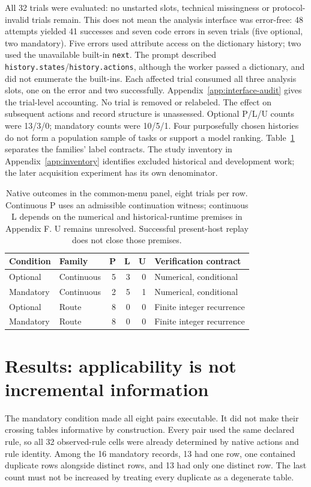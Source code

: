 All 32 trials were evaluated: no unstarted slots, technical missingness or
protocol-invalid trials remain. This does not mean the analysis interface was
error-free: 48 attempts yielded 41 successes and seven code errors in seven
trials (five optional, two mandatory). Five errors used attribute access on
the dictionary history; two used the unavailable built-in \texttt{next}.
The prompt described \texttt{history.states}/\texttt{history.actions}, although
the worker passed a dictionary, and did not enumerate the built-ins.
Each affected trial consumed all three analysis slots, one on the error and
two successfully. Appendix~\ref{app:interface-audit} gives the trial-level
accounting. No trial is removed or relabeled. The effect on subsequent
actions and record structure is unassessed.
Optional P/L/U counts were 13/3/0; mandatory
counts were 10/5/1. Four purposefully chosen histories do not form a population
sample of tasks or support a model ranking. Table~\ref{tab:label-contracts}
separates the families' label contracts. The study inventory in
Appendix~\ref{app:inventory} identifies excluded historical and development
work; the later acquisition experiment has its own denominator.

\begin{table}[htbp]
\centering\small
\begin{tabular}{llrrrl}\toprule
Condition & Family & P & L & U & Verification contract\\\midrule
Optional & Continuous & 5 & 3 & 0 & Numerical, conditional\\
Mandatory & Continuous & 2 & 5 & 1 & Numerical, conditional\\
Optional & Route & 8 & 0 & 0 & Finite integer recurrence\\
Mandatory & Route & 8 & 0 & 0 & Finite integer recurrence\\\bottomrule
\end{tabular}
\caption{Native outcomes in the common-menu panel, eight trials per row.
Continuous P uses an admissible continuation witness; continuous L depends
on the numerical and historical-runtime premises in Appendix F. U remains
unresolved. Successful present-host replay does not close those premises.}
\label{tab:label-contracts}
\end{table}

\section{Results: applicability is not incremental information}
The mandatory condition made all eight pairs executable. It did not make
their crossing tables informative by construction. Every pair used the same
declared rule, so all 32 observed-rule cells were already determined by native
actions and rule identity. Among the 16 mandatory records, 13 had one row,
one contained duplicate rows alongside distinct rows, and 13 had only one
distinct row. The last count must not be increased by treating every duplicate
as a degenerate table.

